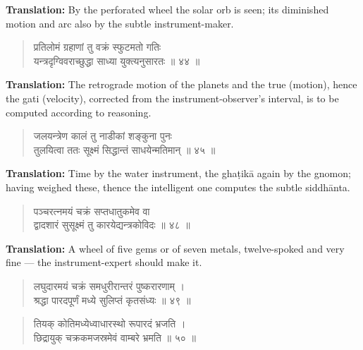\documentclass[11pt,a4paper]{article}
\newenvironment{shloka}{\begin{verse}\devanagarifont\large}{\end{verse}}
\begin{document}
\textbf{Translation:}\quad
By the perforated wheel the solar orb is seen; its diminished motion
and arc also by the subtle instrument-maker.

\vspace{0.3cm}

\begin{shloka}
प्रतिलोमं ग्रहाणां तु वक्रं स्फुटमतो गतिः \\
यन्त्रदृग्विवराच्छुद्धा साध्या युक्त्यनुसारतः ॥ ४४ ॥
\end{shloka}

\textbf{Translation:}\quad
The retrograde motion of the planets and the true (motion), hence
the gati (velocity), corrected from the instrument-observer's
interval, is to be computed according to reasoning.

\vspace{0.3cm}

\begin{shloka}
जलयन्त्रेण कालं तु नाडीकां शङ्कुना पुनः \\
तुलयित्वा ततः सूक्ष्मं सिद्धान्तं साधयेन्मतिमान् ॥ ४५ ॥
\end{shloka}

\textbf{Translation:}\quad
Time by the water instrument, the ghaṭikā again by the gnomon;
having weighed these, thence the intelligent one computes the
subtle siddhānta.

\vspace{0.3cm}

\begin{shloka}
पञ्चरत्नमयं चक्रं सप्तधातुकमेव वा \\
द्वादशारं सुसूक्ष्मं तु कारयेद्यन्त्रकोविदः ॥ ४८ ॥
\end{shloka}

\textbf{Translation:}\quad
A wheel of five gems or of seven metals, twelve-spoked and very
fine — the instrument-expert should make it.

\vspace{0.3cm}

\begin{shloka}
लघुदारमयं चक्रं समधुरीरान्तरं पुष्करारणाम् ।\\
श्रद्धा पारदपूर्णं मध्ये सुलिप्तं कृतसंध्यः ॥ ४९ ॥
\end{shloka}

\begin{shloka}
तियक् कोतिमध्येध्वाधारस्थो रूपारदं भ्रजति ।\\
छिद्रायुक् चक्रकमजस्रमेवं वाम्बरे भ्रमति ॥ ५० ॥
\end{shloka}
\end{document}
